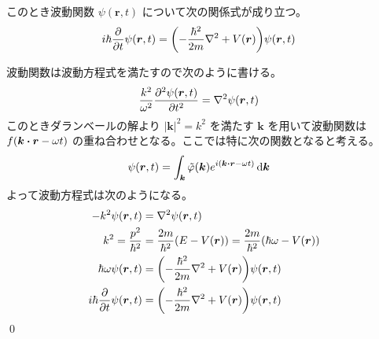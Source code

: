 \documentclass[uplatex,dvipdfmx,a4paper,11pt]{jlreq}
\makeatletter
\newcommand{\rr}{\bm{r}}
\newcommand{\kk}{\bm{k}}
\theoremstyle{definition}
\renewenvironment{proof}[1][\proofname]{\par
  \normalfont
  \topsep6\p@\@plus6\p@ \trivlist
  \item[\hskip\labelsep{\bfseries #1}\@addpunct{\bfseries}]\ignorespaces\quad\par
}{%
  \qed\endtrivlist\@endpefalse
}
\renewcommand\proofname{証明}
\makeatother
\begin{document}
\begin{theorem}
  このとき波動関数 $\psi(\rr, t)$ について次の関係式が成り立つ。
  \begin{align}
    i\hbar\pdv{t}\psi(\rr, t) & = \qty(-\frac{\hbar^2}{2m}\nabla^2 + V(\rr))\psi(\rr, t)
  \end{align}
\end{theorem}
\begin{proof}
  波動関数は波動方程式を満たすので次のように書ける。
  \begin{align}
    \frac{k^2}{\omega^2}\pdv[2]{\psi(\rr, t)}{t} & = \nabla^2\psi(\rr, t)
  \end{align}
  このときダランベールの解より $|\kk|^2 = k^2$ を満たす $\kk$ を用いて波動関数は $f(\kk\vdot\rr - \omega t)$ の重ね合わせとなる。ここでは特に次の関数となると考える。
  \begin{align}
    \psi(\rr, t) & = \int_{\kk}\tilde{\varphi}(\kk)e^{i(\kk\vdot\rr - \omega t)}\dd{\kk}
  \end{align}
  よって波動方程式は次のようになる。
  \begin{align}
    -k^2\psi(\rr, t)          & = \nabla^2\psi(\rr, t)                                                      \\
    k^2 = \frac{p^2}{\hbar^2} & = \frac{2m}{\hbar^2}(E - V(\rr)) = \frac{2m}{\hbar^2}(\hbar\omega - V(\rr)) \\
    \hbar\omega\psi(\rr, t)   & = \qty(-\frac{\hbar^2}{2m}\nabla^2 + V(\rr))\psi(\rr, t)                    \\
    i\hbar\pdv{t}\psi(\rr, t) & = \qty(-\frac{\hbar^2}{2m}\nabla^2 + V(\rr))\psi(\rr, t)
  \end{align}
\end{proof}
\end{document}
